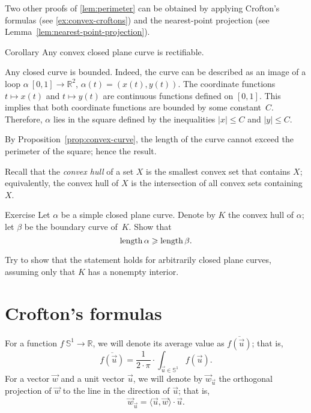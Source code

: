 Two other proofs of \ref{lem:perimeter} can be obtained by applying Crofton's formulas (see \ref{ex:convex-croftons}) and the nearest-point projection (see Lemma~\ref{lem:nearest-point-projection}).  

\begin{thm}{Corollary}\label{cor:convex=>rectifiable}
Any convex closed plane curve is rectifiable.  
\end{thm}

Any closed curve is bounded.
Indeed, the curve can be described as an image of a loop $\alpha\:[0,1]\to\mathbb{R}^2$, $\alpha(t)=(x(t),y(t))$.
The coordinate functions $t\mapsto x(t)$ and $t\mapsto y(t)$ are continuous functions defined on $[0,1]$.
This implies that both coordinate functions are bounded by some constant~$C$.
Therefore, $\alpha$ lies in the square defined by the inequalities $|x|\le C$ and $|y|\le C$.


By Proposition~\ref{prop:convex-curve}, the length of the curve cannot exceed the perimeter of the square; hence the result.
\qeds

Recall that the \emph{convex hull} of a set $X$ is the smallest convex set that contains $X$;
equivalently, the convex hull of $X$ is the intersection of all convex sets containing~$X$.

\begin{thm}{Exercise}\label{ex:convex-hull}
Let $\alpha$ be a simple closed plane curve.
Denote by $K$ the convex hull of $\alpha$; let $\beta$ be the boundary curve of~$K$.
Show that 
\[\mathop{\rm length}\nolimits \alpha\geqslant \mathop{\rm length}\nolimits \beta.\]

Try to show that the statement holds for arbitrarily closed plane curves, assuming only that $K$ has a nonempty interior.
\end{thm}


\section{Crofton's formulas}
\label{sec:crofton}

For a function $f\: \mathbb{S}^1 \to \mathbb{R}$, we will denote its average value as $\overline{f(\vec u)}$;
that is,
\[\overline{f(\vec u)}=\frac1{2\cdot \pi}\cdot\int_{\vec u \in\mathbb{S}^1} f(\vec u).\]
For a vector $\vec w$ and a unit vector $\vec u$, we will denote by $\vec w_{\vec u}$ the orthogonal projection of $\vec w$ to the line in the direction of  $\vec u$;
that is,
\[\vec w_{\vec u}=\langle\vec u,\vec w\rangle\cdot\vec u.\] 

